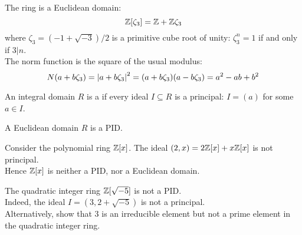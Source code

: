 \begin{example}
The  ring is a Euclidean domain:
\begin{equation}
\mathbb{Z} [\zeta_3] = \mathbb{Z} + \mathbb{Z} \zeta_3 \nonumber
\end{equation}
where $\zeta_3 = (-1 + \sqrt{-3}) /2 $ is a primitive cube root of unity: $\zeta_3^n = 1$ if and only if $3 | n$.\\
The norm function is the square of the usual modulus:
\begin{equation}
N(a+b\zeta_3) = \left\lvert a+b\zeta_3\right\rvert^2 = (a+b\zeta_3)(a-b\zeta_3) = a^2 - ab + b^2 \nonumber
\end{equation}
\end{example}

\begin{definition}
An integral domain $R$ is a  if every ideal $I \subseteq R$ is a principal: $I=(a)$ for some $a \in I$.
\end{definition}

\begin{proposition}
A Euclidean domain $R$ is a PID.
\end{proposition}

\begin{example}
Consider the polynomial ring $\mathbb{Z} [x]$. The ideal $(2,x) = 2\mathbb{Z} [x] + x \mathbb{Z} [x]$ is not principal.\\
Hence $\mathbb{Z} [x]$ is neither a PID, nor a Euclidean domain.
\end{example}

\begin{example}
The quadratic integer ring $\mathbb{Z} [\sqrt{-5}]$ is not a PID.\\
Indeed, the ideal $I = (3, 2+\sqrt{-5})$ is not a principal.\\
Alternatively, show that $3$ is an irreducible element but not a prime element in the quadratic integer ring. 
\end{example}


